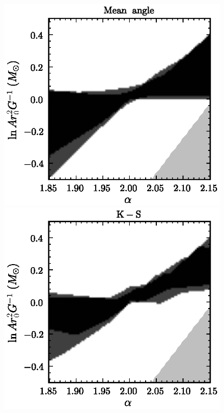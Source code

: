 \clearpage
\begin{figure}
\includegraphics[height=.2\textheight]{figs_solarsystem/freqMean.ps}
\includegraphics[height=.2\textheight]{figs_solarsystem/freqKS.ps}\\[5pt]

\end{figure}
